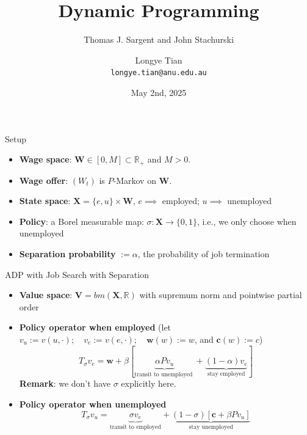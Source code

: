 \documentclass[aspectratio=169]{beamer} %
\title[DP2]{Dynamic Programming}
\subtitle{Thomas J. Sargent and John Stachurski}
\author[Longye]{Longye Tian \\ \texttt{longye.tian@anu.edu.au}}
\institute[ANU]{Australian National University\\ School of Economics}
\date{May 2nd, 2025}
\begin{document}
\begin{frame}
  \titlepage
\end{frame}


\begin{frame}{Setup}
\begin{itemize}
    \item \textbf{Wage space}: $\mathbf{W}\in [0,M]\subset \mathbb{R}_+$ and $M>0$.
    \item \textbf{Wage offer}: $(W_t)$ is $P$-Markov on $\mathbf{W}$.
    \item \textbf{State space}: $\mathbf{X} = \{e,u\}\times \mathbf{W}$, $e\implies$ employed; $u\implies$ unemployed
    \item \textbf{Policy}: a Borel measurable map: $\sigma: \mathbf{X}\to \{0,1\}$, i.e., we only choose when unemployed
    \item \textbf{Separation probability} $:= \alpha $, the probability of job termination
\end{itemize}
    
\end{frame}


\begin{frame}{ADP with Job Search with Separation}
    \begin{itemize}
        \item \textbf{Value space}: $\mathbf{V} = bm(\mathbf{X}, \mathbb{R})$ with supremum norm and pointwise partial order
        \item \textbf{Policy operator when employed} (let $v_u:= v(u,\cdot); \quad v_e:=v(e,\cdot);\quad \mathbf{w}(w):= w$, and $\mathbf{c}(w) := c$)
        $$
        T_\sigma v_e= \mathbf{w}+\beta\left[\underbrace{\alpha Pv_u}_{\text{transit to unemployed }} + \underbrace{(1-\alpha) v_e}_{\text{stay employed}}\right]
        $$
        \textbf{Remark}: we don't have $\sigma$ explicitly here.
        \item \textbf{Policy operator when unemployed}
        $$
        T_\sigma v_u = \underbrace{\sigma v_e}_{\text{transit to employed}} + \underbrace{(1-\sigma)\left[\mathbf{c}+\beta Pv_u\right]}_{\text{stay unemployed}}
        $$
    \end{itemize}
\end{frame}
\end{document}
